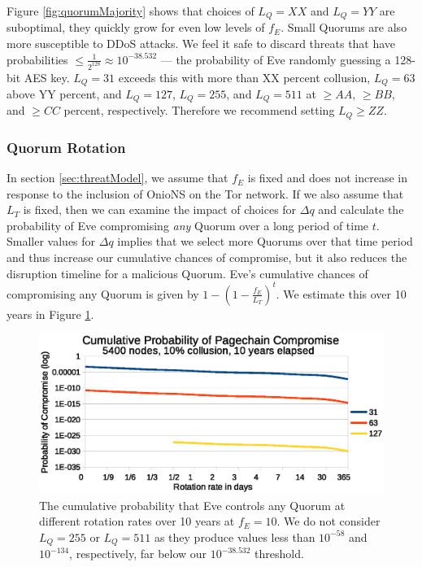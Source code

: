 \documentclass[conference]{IEEEtran}
\begin{document}
Figure \ref{fig:quorumMajority} shows that choices of $ L_{Q} = XX $ and $ L_{Q} = YY $ are suboptimal, they quickly grow for even low levels of $ f_{E} $. Small Quorums are also more susceptible to DDoS attacks. We feel it safe to discard threats that have probabilities $ \leq \frac{1}{2^{128}} \approx 10^{-38.532} $ --- the probability of Eve randomly guessing a 128-bit AES key. $ L_{Q} = 31 $ exceeds this with more than XX percent collusion, $ L_{Q} = 63 $ above YY percent, and $ L_{Q} = 127 $, $ L_{Q} = 255 $, and $ L_{Q} = 511 $ at $ \geq AA $, $ \geq BB $, and $ \geq CC $ percent, respectively. Therefore we recommend setting $ L_{Q} \geq ZZ $.

\subsubsection{Quorum Rotation}

In section \ref{sec:threatModel}, we assume that $ f_{E} $ is fixed and does not increase in response to the inclusion of OnioNS on the Tor network. If we also assume that $ L_{T} $ is fixed, then we can examine the impact of choices for $ \Delta q $ and calculate the probability of Eve compromising \emph{any} Quorum over a long period of time $ t $. Smaller values for $ \Delta q $ implies that we select more Quorums over that time period and thus increase our cumulative chances of compromise, but it also reduces the disruption timeline for a malicious Quorum. Eve's cumulative chances of compromising any Quorum is given by $ 1 - (1 - \frac{f_{E}}{L_{T}})^t $. We estimate this over 10 years in Figure \ref{fig:cumulativeProbability}.

\begin{figure}[h]
	\centering
	\includegraphics[width=\linewidth]{../assets/analysis/CumulativeMaliciousQuorum_tight.eps}
	\caption{The cumulative probability that Eve controls any Quorum at different rotation rates over 10 years at $ f_{E} = 10 $. We do not consider $ L_{Q} = 255 $ or $ L_{Q} = 511 $ as they produce values less than $ 10^{-58} $ and $ 10^{-134} $, respectively, far below our $ 10^{-38.532} $ threshold.}
	\label{fig:cumulativeProbability}
\end{figure}
\end{document}
